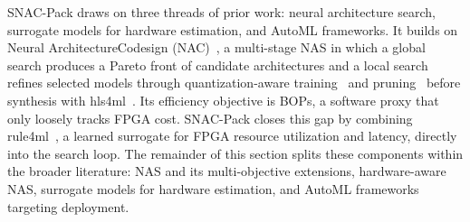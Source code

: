 \documentclass[11pt]{article}
\begin{document}


SNAC-Pack draws on three threads of prior work: neural architecture search, surrogate models for hardware estimation, and AutoML
frameworks.
It builds on Neural ArchitectureCodesign (NAC)~\citep{Weitz_2025}, a multi-stage NAS in which a global search produces a Pareto front of candidate architectures and a local search refines selected models through quantization-aware training~\citep{quantization_survey} and pruning~\citep{modelcompression} before synthesis with hls4ml~\citep{hls4ml,fastml_hls4ml,10.1145/3801979}.
Its efficiency objective is BOPs, a software proxy that only loosely tracks FPGA cost.
SNAC-Pack closes this gap by combining rule4ml~\citep{Rahimifar_2025}, a learned surrogate for FPGA resource utilization and latency, directly into the search loop.
The remainder of this section splits these components within the broader literature: NAS and its multi-objective extensions, hardware-aware NAS, surrogate models for hardware estimation, and AutoML frameworks targeting deployment.
\end{document}
